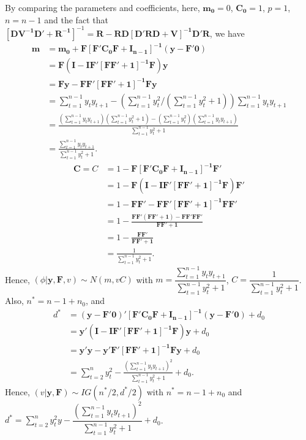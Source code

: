 \documentclass[12pt]{article}\usepackage[]{graphicx}\usepackage[]{color}
\begin{document}
\begin{enumerate}
	By comparing the parameters and coefficients, here, $\mathbf{m_0} = 0$, $\mathbf{C_0} = 1$, $p=1$, $n = n-1$ and the fact that $[\mathbf{DV^{-1}D'+R^{-1}}]^{-1} = \mathbf{R-RD[D'RD+V]^{-1}D'R}$, we have
	\begin{align*}
		\mathbf{m} &= \mathbf{m_0} + \mathbf{F[F'C_0F + I_{n-1}]^{-1}(y-F'0)}\\
		&=\mathbf{F(I-IF'[FF'+1]^{-1}F)y}\\
		&=\mathbf{Fy - FF'[FF'+1]^{-1}Fy}\\
		&=\sum_{t=1}^{n-1}y_ty_{t+1} - \left(\sum_{t=1}^{n-1}y_t^2/\left(\sum_{t=1}^{n-1}y_t^2 + 1\right)\right)\sum_{t=1}^{n-1}y_ty_{t+1}\\
		&=\frac{(\sum_{t=1}^{n-1}y_ty_{t+1})(\sum_{t=1}^{n-1}y_t^2 + 1)-(\sum_{t=1}^{n-1}y_t^2)(\sum_{t=1}^{n-1}y_ty_{t+1})}{\sum_{t=1}^{n-1}y_t^2 + 1}\\
		&=\frac{\sum_{t=1}^{n-1}y_ty_{t+1}}{\sum_{t=1}^{n-1}y_t^2 + 1}.
	\end{align*}
	\begin{align*}
		\mathbf{C} = C &= 1 - \mathbf{F[F'C_0F + I_{n-1}]^{-1}F'}\\
		&=1-\mathbf{F(I-IF'[FF'+1]^{-1}F)F'}\\
		&=1-\mathbf{FF' - FF'[FF'+1]^{-1}FF'}\\
		&=1-\mathbf{\frac{FF'(FF'+1)-FF'FF'}{FF'+1}}\\
		&=1-\mathbf{\frac{FF'}{FF'+1}}\\
		&=\frac{1}{\sum_{t=1}^{n-1}y_t^2 + 1}.
	\end{align*}
	Hence, $(\phi|\mathbf{y, F},v) \sim N(m, vC)$ with $m=\dfrac{\sum_{t=1}^{n-1}y_ty_{t+1}}{\sum_{t=1}^{n-1}y_t^2 + 1}$, $C=\dfrac{1}{\sum_{t=1}^{n-1}y_t^2 + 1}$. Also, $n^* = n - 1 + n_0$, and 
	\begin{align*}
		d^* &= \mathbf{(y-F'0)'[F'C_0F + I_{n-1}]^{-1}(y-F'0)} + d_0\\
		&=\mathbf{y'(I-IF'[FF'+1]^{-1}F)y} + d_0\\
		&=\mathbf{y'y - y'F'[FF'+1]^{-1}Fy} + d_0\\
		&=\sum_{t=2}^{n}y_t^2 - \frac{\left(\sum_{t=1}^{n-1}y_ty_{t+1}\right)^2}{\sum_{t=1}^{n-1}y_t^2 + 1} + d_0.
	\end{align*}
	Hence, $(v|\mathbf{y, F}) \sim IG(n^*/2, d^*/2)$ with $n^* = n - 1 + n_0$ and $d^*=\sum_{t=2}^{n}y_t^2y - \dfrac{\left(\sum_{t=1}^{n-1}y_ty_{t+1}\right)^2}{\sum_{t=1}^{n-1}y_t^2 + 1} + d_0$.
	

\end{enumerate}
\end{document}
